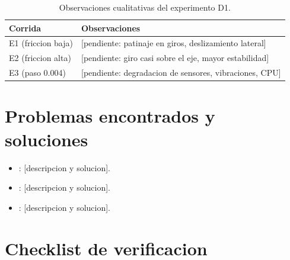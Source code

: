 \documentclass[11pt,a4paper]{article}
\begin{document}

\begin{table}[H]
  \centering
  \caption{Observaciones cualitativas del experimento D1.}
  \label{tab:d1}
  \begin{tabularx}{\linewidth}{lX}
    \toprule
    Corrida & Observaciones \\
    \midrule
    E1 (friccion baja) & [pendiente: patinaje en giros, deslizamiento lateral] \\
    E2 (friccion alta) & [pendiente: giro casi sobre el eje, mayor estabilidad] \\
    E3 (paso 0.004)    & [pendiente: degradacion de sensores, vibraciones, CPU] \\
    \bottomrule
  \end{tabularx}
\end{table}

\section{Problemas encontrados y soluciones}
\label{sec:problemas}


\begin{itemize}
  \item [Problema 1]: [descripcion y solucion].
  \item [Problema 2]: [descripcion y solucion].
  \item [Problema 3]: [descripcion y solucion].
\end{itemize}

\section{Checklist de verificacion}
\label{sec:checklist}
\end{document}
